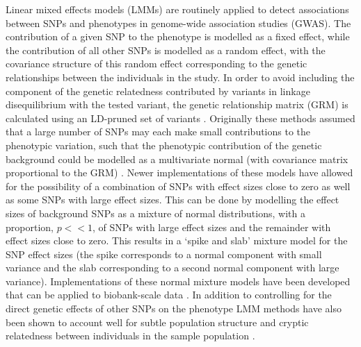 \documentclass[doublespacing]{bmcart}
\begin{document}
Linear mixed effects models (LMMs) are routinely applied to detect associations between SNPs and phenotypes in genome-wide association studies (GWAS). The contribution of a given SNP to the phenotype is modelled as a fixed effect, while the contribution of all other SNPs is modelled as a random effect, with the covariance structure of this random effect corresponding to the genetic relationships between the individuals in the study. In order to avoid including the component of the genetic relatedness contributed by variants in linkage disequilibrium with the tested variant, the genetic relationship matrix (GRM) is calculated using an LD-pruned set of variants \cite{yu2006unified,emma}. Originally these methods assumed that a large number of SNPs may each make small contributions to the phenotypic variation, such that the phenotypic contribution of the genetic background could be modelled as a multivariate normal (with covariance matrix proportional to the GRM) \cite{emma, emmax,gemma,fastlmm}. Newer implementations of these models have allowed for the possibility of a combination of SNPs with effect sizes close to zero as well as some SNPs with large effect sizes. This can be done by modelling the effect sizes of background SNPs as a mixture of normal distributions, with a proportion, $p << 1$, of SNPs with large effect sizes and the remainder with effect sizes close to zero. This results in a ‘spike and slab’ mixture model for the SNP effect sizes \cite{BOLT} (the spike corresponds to a normal component with small variance and the slab corresponding to a second normal component with large variance). Implementations of these normal mixture models have been developed that can be applied to biobank-scale data \cite{boltukb}. In addition to controlling for the direct genetic effects of other SNPs on the phenotype LMM methods have also been shown to account well for subtle population structure and cryptic relatedness between individuals in the sample population \cite{yu2006unified,emma,emmax,gemma,price2010new}.  

 \par
\end{document}
